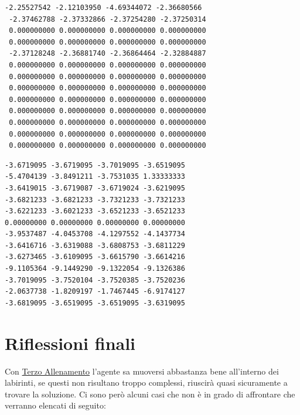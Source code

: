 \begin{minipage}{\textwidth}
	\begin{minipage}{.45\textwidth}
		\begin{lstlisting}[style=python, basicstyle=\tiny, caption={Alcune righe della matrice Q di Secondo Allenamento}]
 -2.25527542 -2.12103950 -4.69344072 -2.36680566
 -2.37462788 -2.37332866 -2.37254280 -2.37250314
 0.000000000 0.000000000 0.000000000 0.000000000
 0.000000000 0.000000000 0.000000000 0.000000000
 -2.37128248 -2.36881740 -2.36864464 -2.32884887
 0.000000000 0.000000000 0.000000000 0.000000000
 0.000000000 0.000000000 0.000000000 0.000000000
 0.000000000 0.000000000 0.000000000 0.000000000
 0.000000000 0.000000000 0.000000000 0.000000000
 0.000000000 0.000000000 0.000000000 0.000000000
 0.000000000 0.000000000 0.000000000 0.000000000
 0.000000000 0.000000000 0.000000000 0.000000000
 0.000000000 0.000000000 0.000000000 0.000000000
		\end{lstlisting}
	\end{minipage}
	\hfill
	\begin{minipage}{.45\textwidth}
		\begin{lstlisting}[style=python, basicstyle=\tiny, caption={Alcune righe della matrice Q di Terzo Allenamento}]
-3.6719095 -3.6719095 -3.7019095 -3.6519095
-5.4704139 -3.8491211 -3.7531035 1.33333333
-3.6419015 -3.6719087 -3.6719024 -3.6219095
-3.6821233 -3.6821233 -3.7321233 -3.7321233
-3.6221233 -3.6021233 -3.6521233 -3.6521233
0.00000000 0.00000000 0.00000000 0.00000000
-3.9537487 -4.0453708 -4.1297552 -4.1437734
-3.6416716 -3.6319088 -3.6808753 -3.6811229
-3.6273465 -3.6109095 -3.6615790 -3.6614216
-9.1105364 -9.1449290 -9.1322054 -9.1326386
-3.7019095 -3.7520104 -3.7520385 -3.7520236
-2.0637738 -1.8209197 -1.7467445 -6.9174127
-3.6819095 -3.6519095 -3.6519095 -3.6319095
		\end{lstlisting}
	\end{minipage}
\end{minipage}

\section{Riflessioni finali}
\label{sec:riflessioni}

Con \hyperref[sec:terzo]{Terzo Allenamento} l'agente sa muoversi abbastanza bene all'interno dei labirinti, se questi non risultano troppo complessi, riuscir\`{a} quasi sicuramente a trovare la soluzione.
Ci sono per\`{o} alcuni casi che non \`{e} in grado di affrontare che verranno elencati di seguito:

